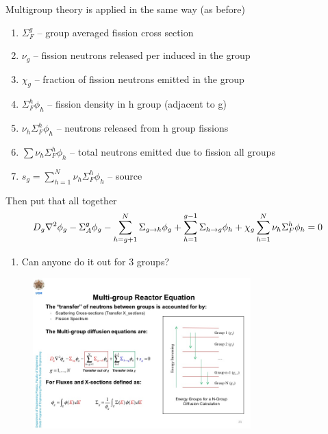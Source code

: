 \documentclass[aspectratio=1610,pdftex,dvipsnames,compress,xcolor={dvipsnames}]{beamer}
\begin{document}
\begin{frame}{Multigroup theory is applied in the same way (as before)}
    \begin{enumerate}[series=outerlist,topsep=0pt,itemsep=21pt,leftmargin=*,label=(\arabic*)]
        \item[]$\Sigma_F^g$ -- group averaged fission cross section
        \item[]$\nu_g$ -- fission neutrons released per induced in the group
        \item[]$\chi_g$ -- fraction of fission neutrons emitted in the group
        \item[]$\Sigma_F^h \phi_h$ -- fission density in h group (adjacent to g)
        \item[]$\nu_h \Sigma_F^h \phi_h$ -- neutrons released from h group fissions
        \item[]$\sum \nu_h \Sigma_F^h \phi_h$ -- total neutrons emitted due to fission all groups
        \item[]$s_g = \sum_{h=1}^N \nu_h \Sigma_F^h \phi_h$ -- source
    \end{enumerate}
\end{frame}


\begin{frame}{Then put that all together}
    \begin{equation}
        \Large
        D_g \nabla^2 \phi_g - \Sigma_A^g \phi_g - \sum_{h=g + 1}^N \Sigma_{g \rightarrow h}\phi_g + \sum_{h=1}^{g-1} \Sigma_{h \rightarrow g} \phi_h + \chi_g \sum_{h=1}^N \nu_h \Sigma_F^h \phi_h = 0
    \end{equation}

    \vspace*{\fill}

    \begin{enumerate}[series=outerlist,topsep=0pt,itemsep=21pt,leftmargin=*,label=(\arabic*)]
        \item[] Can anyone do it out for 3 groups?
    \end{enumerate}
\end{frame}


\begin{frame}{}
    \begin{figure}
        \centering
        \includegraphics[width=0.75\textwidth]{group.theory.jpg}
    \end{figure}
\end{frame}
\end{document}
